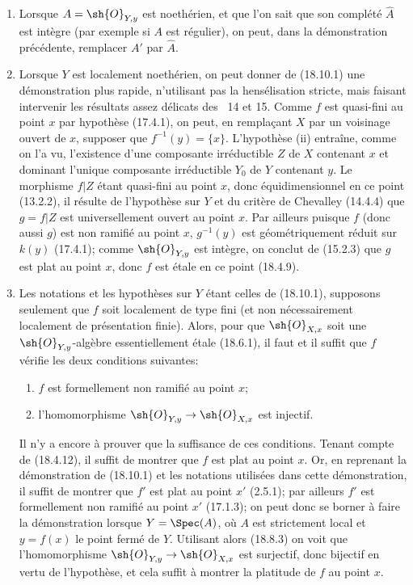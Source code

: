 \begin{remark}[18.10.2]
\label{IV.18.10.2}
\begin{enumerate}
  \item[(i)] Lorsque $A=\sh{O}_{Y,y}$ est noethérien, et que l'on sait que son complété $\widehat A$ est intègre (par exemple si $A$ est régulier), on peut, dans la démonstration précédente, remplacer $A'$ par $\widehat A$.
  \item[(ii)] Lorsque $Y$ est localement noethérien, on peut donner de (18.10.1) une démonstration plus rapide, n'utilisant pas la hensélisation stricte, mais faisant intervenir les résultats assez délicats des \textsection\textsection~14 et 15. Comme $f$ est quasi-fini au point $x$ par hypothèse (17.4.1), on peut, en remplaçant $X$ par un voisinage ouvert de $x$, supposer que $f^{-1}(y)=\{x\}$. L'hypothèse (ii) entraîne, comme on l'a vu, l'existence d'une composante irréductible $Z$ de $X$ contenant $x$ et dominant l'unique composante irréductible $Y_0$ de $Y$ contenant $y$. Le morphisme $f|Z$ étant quasi-fini au point $x$, donc équidimensionnel en ce point (13.2.2), il résulte de l'hypothèse sur $Y$ et du critère de Chevalley (14.4.4) que $g=f|Z$ est universellement ouvert au point $x$. Par ailleurs puisque $f$ (donc aussi $g$) est non ramifié au point $x$, $g^{-1}(y)$ est géométriquement réduit sur $k(y)$ (17.4.1); comme $\sh{O}_{Y,y}$ est intègre, on conclut de (15.2.3) que $g$ est plat au point $x$, donc $f$ est étale en ce point (18.4.9).
  \item[(iii)] Les notations et les hypothèses sur $Y$ étant celles de (18.10.1), supposons seulement que $f$ soit localement de type fini (et non nécessairement localement de présentation finie). Alors, pour que $\sh{O}_{X,x}$ soit une $\sh{O}_{Y,y}$-algèbre essentiellement étale (18.6.1), il faut et il suffit que $f$ vérifie les deux conditions suivantes:


\begin{enumerate}
  \item[$1^\circ$] $f$ est formellement non ramifié au point $x$;
  \item[$2^\circ$] l'homomorphisme $\sh{O}_{Y,y}\to\sh{O}_{X,x}$ est injectif.
\end{enumerate}

Il n'y a encore à prouver que la suffisance de ces conditions. Tenant compte de (18.4.12), il suffit de montrer que $f$ est plat au point $x$. Or, en reprenant la démonstration de (18.10.1) et les notations utilisées dans cette démonstration, il suffit de montrer que $f'$ est plat au point $x'$ (2.5.1); par ailleurs $f'$ est formellement non ramifié au point $x'$ (17.1.3); on peut donc se borner à faire la démonstration lorsque $Y=\Spec(A)$, où $A$ est strictement local et $y=f(x)$ le point fermé de $Y$. Utilisant alors (18.8.3) on voit que l'homomorphisme $\sh{O}_{Y,y}\to\sh{O}_{X,x}$ est surjectif, donc bijectif en vertu de l'hypothèse, et cela suffit à montrer la platitude de $f$ au point $x$.


\end{enumerate}
\end{remark}
